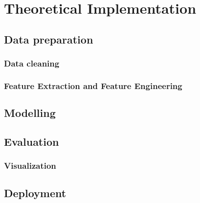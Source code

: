 \chapter{Theoretical Implementation}

\section{Data preparation}


\subsection{Data cleaning}


\subsection{Feature Extraction and Feature Engineering}

\section{Modelling}
\section{Evaluation}
\subsection{Visualization}
\section{Deployment}
